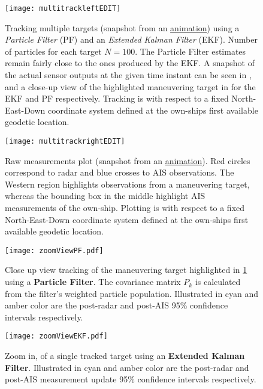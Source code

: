\begin{figure}
	\centering
	\texttt{[image: multitrackleftEDIT]}
	\caption{Tracking multiple targets (snapshot from an \href{https://dimidagd.github.io/thesis/3dView_real_dataEKFandPF.gif}{animation}) using a \emph{Particle Filter} (PF) and an \emph{Extended Kalman Filter} (EKF). Number of particles for each target $N=100$. The Particle Filter estimates remain fairly close to the ones produced by the EKF. A snapshot of the actual sensor outputs at the given time instant can be seen in , and a close-up view of the highlighted maneuvering target in  for the EKF and PF respectively. Tracking is with respect to a fixed North-East-Down coordinate system defined at the own-ships first available geodetic location.}
	\label{fig:EKFandPF}
\end{figure}

\begin{figure}
	\centering
	\texttt{[image: multitrackrightEDIT]}
	\caption{Raw measurements plot (snapshot from an \href{https://dimidagd.github.io/thesis/tracking_to_referenceEKFandPF.gif}{animation}). Red circles correspond to radar and blue crosses to AIS observations. The Western region highlights observations from a maneuvering target, whereas the bounding box in the middle highlight AIS measurements of the own-ship.  Plotting is with respect to a fixed North-East-Down coordinate system defined at the own-ships first available geodetic location.}
	\label{fig:EKFandPFraw}
\end{figure}


\begin{figure}
	\centering
	\texttt{[image: zoomViewPF.pdf]}
	\caption{Close up view tracking of the maneuvering target highlighted in \cref{fig:EKFandPF} using a \textbf{Particle Filter}. The covariance matrix $P_k$ is calculated from the filter's weighted particle population. Illustrated in cyan and amber color are the post-radar and post-AIS 95\% confidence intervals respectively. }
	\label{fig:zoomviewpf}
\end{figure}


\begin{figure}
	\centering
	\texttt{[image: zoomViewEKF.pdf]}
	\caption{Zoom in, of a single tracked target using an \textbf{Extended Kalman Filter}. Illustrated in cyan and amber color are the post-radar and post-AIS measurement update 95\% confidence intervals respectively. }
	\label{fig:zoomviewEKF}
\end{figure}



